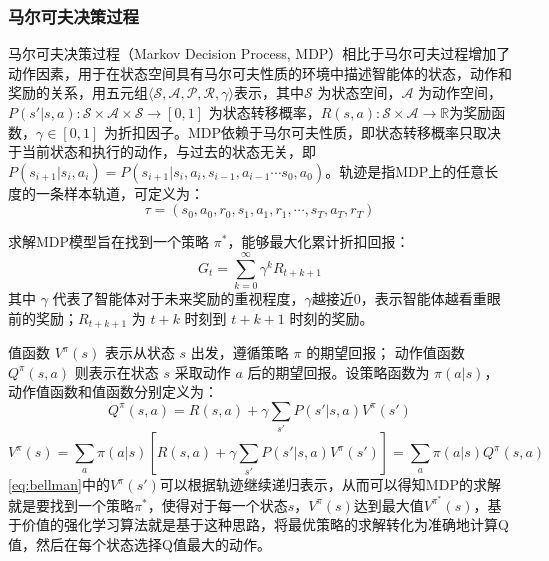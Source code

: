 \documentclass[12pt, a4paper, UTF8]{ctexart}
\numberwithin{equation}{section}
\begin{document}
\subsubsection{马尔可夫决策过程}
马尔可夫决策过程（Markov Decision Process, MDP）相比于马尔可夫过程增加了动作因素，用于在状态空间具有马尔可夫性质的环境中描述智能体的状态，动作和奖励的关系，用五元组$\langle \mathcal{S}, \mathcal{A}, \mathcal P, \mathcal R, \gamma \rangle$表示，其中$\mathcal{S}$ 为状态空间，$\mathcal{A}$ 为动作空间，$P(s'|s,a):\mathcal{S}\times \mathcal{A}\times \mathcal{S}\rightarrow [0,1]$ 为状态转移概率，$R(s,a):\mathcal{S}\times \mathcal{A}\rightarrow \mathbb{R}$为奖励函数，$\gamma\in [0,1]$ 为折扣因子。MDP依赖于马尔可夫性质，即状态转移概率只取决于当前状态和执行的动作，与过去的状态无关，即 $P(s_{i+1}|s_i,a_i) = P(s_{i+1}|s_i,a_i,s_{i-1},a_{i-1}\cdots s_0,a_0)$。轨迹是指MDP上的任意长度的一条样本轨道，可定义为：
\begin{equation}
  \tau = (s_0, a_0, r_0, s_1, a_1, r_1, \cdots, s_T, a_T, r_T)
  \label{eq:trajectory}
\end{equation}

求解MDP模型旨在找到一个策略 $\pi^*$，能够最大化累计折扣回报：
\begin{equation}
  G_t = \sum_{k=0}^{\infty} \gamma^k R_{t+k+1}
  \label{eq:return}
\end{equation}
其中 $\gamma$ 代表了智能体对于未来奖励的重视程度，$\gamma$越接近0，表示智能体越看重眼前的奖励；$R_{t+k+1}$ 为 $t+k$ 时刻到 $t+k+1$ 时刻的奖励。

值函数 $V^{\pi}(s)$ 表示从状态 $s$ 出发，遵循策略 $\pi$ 的期望回报；
动作值函数 $Q^{\pi}(s,a)$ 则表示在状态 $s$ 采取动作 $a$ 后的期望回报。设策略函数为 $\pi(a|s)$，动作值函数和值函数分别定义为：
\begin{equation}
  Q^{\pi}(s,a) =R(s, a) + \gamma \sum_{s'} P(s'|s, a) V^{\pi}(s')
  \label{eq:bellman_q}
\end{equation}
\begin{equation}
  V^{\pi}(s) = \sum_{a} \pi(a|s) \left[ R(s, a) + \gamma \sum_{s'} P(s'|s, a) V^{\pi}(s') \right]=\sum_{a} \pi(a|s)Q^{\pi}(s,a)
  \label{eq:bellman}
\end{equation}
\autoref{eq:bellman}中的$V^{\pi}(s')$可以根据轨迹继续递归表示，从而可以得知MDP的求解就是要找到一个策略$\pi^*$，使得对于每一个状态$s$，$V^{\pi}(s)$达到最大值$V^{\pi^*}(s)$，基于价值的强化学习算法就是基于这种思路，将最优策略的求解转化为准确地计算Q值，然后在每个状态选择Q值最大的动作。
\end{document}
